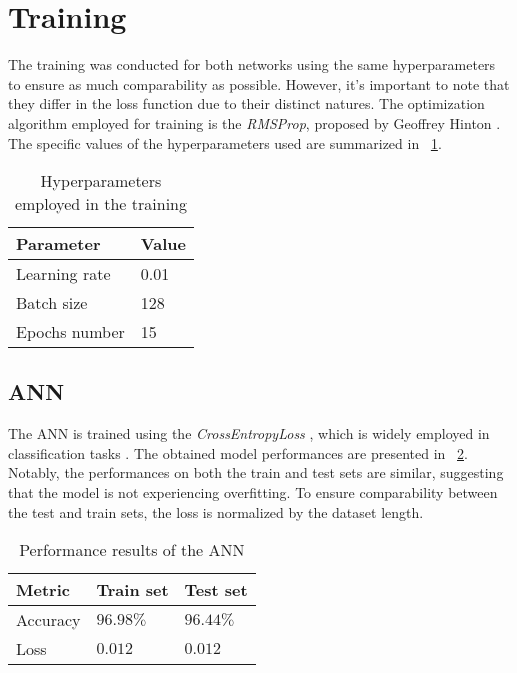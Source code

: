 \section{Training}

The training was conducted for both networks using the same hyperparameters to ensure as much comparability as possible. However, it's important to note that they differ in the loss function due to their distinct natures. The optimization algorithm employed for training is the \textit{RMSProp}, proposed by Geoffrey Hinton \cite{OMBGD}. The specific values of the hyperparameters used are summarized in \Tab~\ref{table:HyperParam}.

\begin{table}[h]
	\centering
	\begin{tabular}{|| l | l ||} 
		\hline
		\textbf{Parameter} & \textbf{Value} \\
		\hline
		\hline
		Learning rate & 0.01 \\
		Batch size & 128 \\
		Epochs number & 15 \\	
		\hline
	\end{tabular}	
	\caption{Hyperparameters employed in the training}
	\label{table:HyperParam}
\end{table}


\subsection{ANN}

The ANN is trained using the \textit{CrossEntropyLoss} \cite{CELoss}, which is widely employed in classification tasks \cite{mao2023crossentropy}. The obtained model performances are presented in \Tab~\ref{table:annper}. Notably, the performances on both the train and test sets are similar, suggesting that the model is not experiencing overfitting. To ensure comparability between the test and train sets, the loss is normalized by the dataset length.

\begin{table}[h]
	\centering
	\begin{tabular}{|| l | l | l ||} 
		\hline
		\textbf{Metric} & \textbf{Train set} & \textbf{Test set}\\
		\hline
		\hline
		Accuracy & $96.98\%$ & $96.44\%$\\	
		Loss & $0.012$ & $0.012$\\
		\hline
	\end{tabular}	
	\caption{Performance results of the ANN}
	\label{table:annper}
\end{table}


